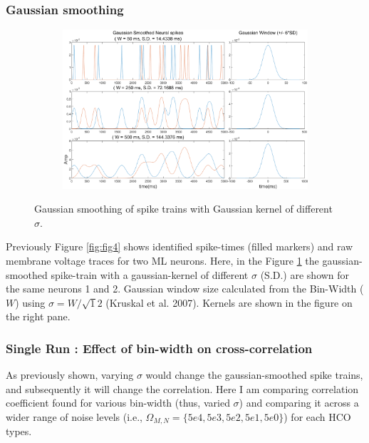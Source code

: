 \documentclass[
]{article}
\begin{document}
\hypertarget{blc}{%
\subsubsection{Gaussian smoothing}\label{blc}}

\begin{figure}
  \centering
  \begin{subfigure}[b]{\textwidth}
      \includegraphics[width=\textwidth]{figs/F5_GCFR_GW.png}
  \end{subfigure}
  \vspace{-0.5cm}
  \caption{Gaussian smoothing of spike trains with Gaussian kernel of different $\sigma$.} \label{fig:fig5gcfr}
\end{figure}

Previously Figure \ref{fig:fig4} shows identified spike-times (filled markers) and raw membrane voltage traces for two ML neurons. Here, in the Figure \ref{fig:fig5gcfr} the gaussian-smoothed spike-train with a gaussian-kernel of different \(\sigma\) (S.D.) are shown for the same neurons 1 and 2. Gaussian window size calculated from the Bin-Width (\(W\)) using \(\sigma=W/\sqrt12\) (Kruskal et al. 2007). Kernels are shown in the figure on the right pane.

\hypertarget{single-run-effect-of-bin-width-on-cross-correlation}{%
\subsubsection{Single Run : Effect of bin-width on cross-correlation}\label{single-run-effect-of-bin-width-on-cross-correlation}}

As previously shown, varying \(\sigma\) would change the gaussian-smoothed spike trains, and subsequently it will change the correlation. Here I am comparing correlation coefficient found for various bin-width (thus, varied \(\sigma\)) and comparing it across a wider range of noise levels (i.e., \(\Omega_{M,N}=\{5e4, 5e3, 5e2, 5e1, 5e0\}\)) for each HCO types.
\end{document}
